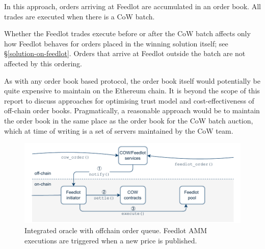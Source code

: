 \documentclass[a4paper,10pt]{article}
\theoremstyle{remark}
\begin{document}
In this approach, orders arriving at Feedlot are accumulated in an order book.
%
All trades are executed when there is a CoW batch.

%
Whether the Feedlot trades execute before or after the CoW batch affects only how Feedlot behaves for orders placed in the winning solution itself; see \S\ref{solution-on-feedlot}.
%
Orders that arrive at Feedlot outside the batch are not affected by this ordering.

As with any order book based protocol, the order book itself would potentially be quite expensive to maintain on the Ethereum chain.
%
It is beyond the scope of this report to discuss approaches for optimising trust model and cost-effectiveness of off-chain order books.
%
Pragmatically, a reasonable approach would be to maintain the order book in the same place as the order book for the CoW batch auction, which at time of writing is a set of servers maintained by the CoW team.
\begin{figure}
  \begin{center}
    \includegraphics{diagrams/sub-merged.pdf}
    \caption{Integrated oracle with offchain order queue. Feedlot AMM executions are triggered when a new price is published.}
  \end{center}
\end{figure}
\end{document}
